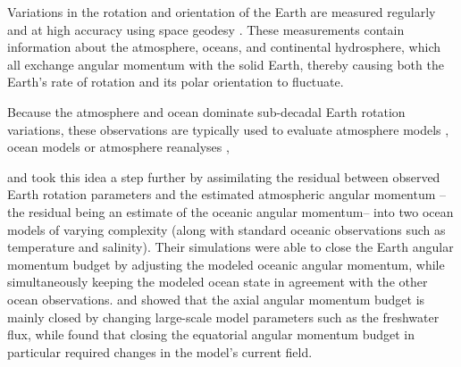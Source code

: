 
Variations in the rotation and orientation of the Earth are measured regularly and at high accuracy using space geodesy \citep{Gross1992,iers}. 
These measurements contain information about the atmosphere, oceans, and continental hydrosphere, which all exchange angular momentum with the solid Earth, thereby causing both the Earth's rate of rotation and its polar orientation to fluctuate. 

Because the atmosphere and ocean dominate sub-decadal Earth rotation variations, 
these observations are typically used to evaluate  
atmosphere models \citep{Boer1990, Rosen2000,Neef2012}, ocean 
models \citep{Gross1996a} or atmosphere reanalyses \citep{Yu1999, Aoyama2000, 
Paek2012a,Berrisford2011},

\citet{Saynisch2010,Saynisch2011} and \citet{Saynisch2012} took this idea a step further by assimilating the residual between observed Earth rotation parameters and the estimated atmospheric angular momentum --the residual being an estimate of the oceanic angular momentum-- into two ocean models of varying complexity (along with standard oceanic observations such as temperature and salinity). 
Their simulations were able to close the Earth angular momentum budget by adjusting the modeled oceanic angular momentum, while simultaneously keeping the modeled ocean state in agreement with the other ocean observations.  
\citet{Saynisch2010} and \citet{Saynisch2012} showed that the axial angular momentum budget is mainly closed by changing large-scale model parameters such as the freshwater flux, while \citet{Saynisch2011} found that closing the equatorial angular momentum budget in particular required changes in the model's current field. 

